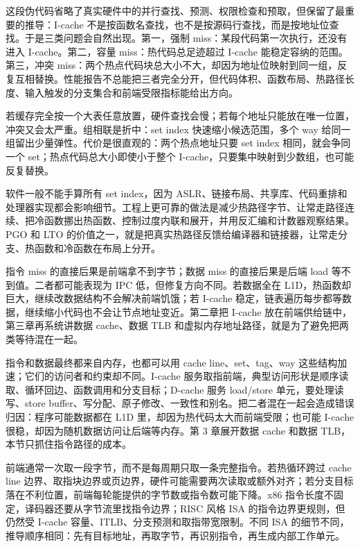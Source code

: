 这段伪代码省略了真实硬件中的并行查找、预测、权限检查和预取，但保留了最重要的推导：I-cache 不是按函数名查找，也不是按源码行查找，而是按地址位查找。于是三类问题会自然出现。第一，强制 miss：某段代码第一次执行，还没有进入 I-cache。第二，容量 miss：热代码总足迹超过 I-cache 能稳定容纳的范围。第三，冲突 miss：两个热点代码块总大小不大，却因为地址位映射到同一组，反复互相替换。性能报告不总能把三者完全分开，但代码体积、函数布局、热路径长度、输入触发的分支集合和前端受限指标能给出方向。

若缓存完全按一个大表任意放置，硬件查找会慢；若每个地址只能放在唯一位置，冲突又会太严重。组相联是折中：set index 快速缩小候选范围，多个 way 给同一组留出少量弹性。代价是很直观的：两个热点地址只要 set index 相同，就会争同一个 set；热点代码总大小即使小于整个 I-cache，只要集中映射到少数组，也可能反复替换。

软件一般不能手算所有 set index，因为 ASLR、链接布局、共享库、代码重排和处理器实现都会影响细节。工程上更可靠的做法是减少热路径字节、让常走路径连续、把冷函数挪出热函数、控制过度内联和展开，并用反汇编和计数器观察结果。PGO 和 LTO 的价值之一，就是把真实热路径反馈给编译器和链接器，让常走分支、热函数和冷函数在布局上分开。

指令 miss 的直接后果是前端拿不到字节；数据 miss 的直接后果是后端 load 等不到值。二者都可能表现为 IPC 低，但修复方向不同。若数据全在 L1D，热函数却巨大，继续改数据结构不会解决前端饥饿；若 I-cache 稳定，链表遍历每步都等数据，继续缩小代码也不会让节点地址变近。第二章把 I-cache 放在前端供给链中，第三章再系统讲数据 cache、数据 TLB 和虚拟内存地址路径，就是为了避免把两类等待混在一起。

指令和数据最终都来自内存，也都可以用 cache line、set、tag、way 这些结构加速；它们的访问者和约束却不同。I-cache 服务取指前端，典型访问形状是顺序读取、循环回边、函数调用和分支目标；D-cache 服务 load/store 单元，要处理读写、store buffer、写分配、原子修改、一致性和别名。把二者混在一起会造成错误归因：程序可能数据都在 L1D 里，却因为热代码太大而前端受限；也可能 I-cache 很稳，却因为随机数据访问让后端等内存。第 3 章展开数据 cache 和数据 TLB，本节只抓住指令路径的成本。

前端通常一次取一段字节，而不是每周期只取一条完整指令。若热循环跨过 cache line 边界、取指块边界或页边界，硬件可能需要两次读取或额外对齐；若分支目标落在不利位置，前端每轮能提供的字节数或指令数可能下降。x86 指令长度不固定，译码器还要从字节流里找指令边界；RISC 风格 ISA 的指令边界更规则，但仍然受 I-cache 容量、ITLB、分支预测和取指带宽限制。不同 ISA 的细节不同，推导顺序相同：先有目标地址，再取字节，再识别指令，再生成内部工作单元。

